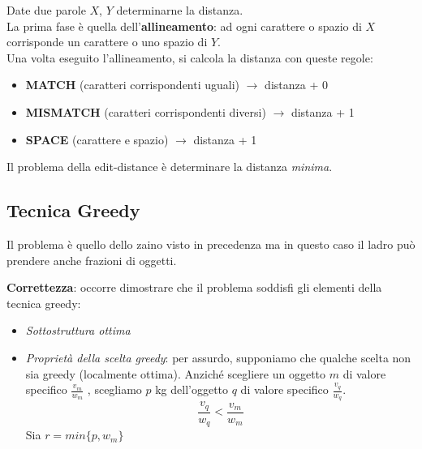 \begin{example}
	
\end{example}

\begin{example}
	Date due parole $X$, $Y$ determinarne la distanza.\\
	La prima fase è quella dell'\textbf{allineamento}: ad ogni carattere o spazio di $X$ corrisponde un carattere o uno spazio di $Y$.\\
	Una volta eseguito l'allineamento, si calcola la distanza con queste regole:
	\begin{itemize}
		\item \textbf{MATCH} (caratteri corrispondenti uguali) $\rightarrow$ distanza + 0
		\item \textbf{MISMATCH} (caratteri corrispondenti diversi) $\rightarrow$ distanza + 1
		\item \textbf{SPACE} (carattere e spazio) $\rightarrow$ distanza + 1
	\end{itemize}
	Il problema della edit-distance è determinare la distanza \emph{minima}.
\end{example}

\subsection{Tecnica Greedy}
\begin{example}
	Il problema è quello dello zaino visto in precedenza ma in questo caso il ladro può prendere anche frazioni di oggetti.
	
	\textbf{Correttezza}: occorre dimostrare che il problema soddisfi gli elementi della tecnica greedy:
	\begin{itemize}
		\item \emph{Sottostruttura ottima}
		\item \emph{Proprietà della scelta greedy}: per assurdo, supponiamo che qualche scelta non sia greedy (localmente ottima). Anziché scegliere un oggetto $m$ di valore specifico $\frac{v_m}{w_m}$ , scegliamo $p$ kg dell'oggetto $q$ di valore specifico $\frac{v_q}{w_q}$.
		\begin{equation*}
			\frac{v_q}{w_q} < \frac{v_m}{w_m}
		\end{equation*}
		Sia $r=min\{p, w_m\}$
	\end{itemize}
\end{example}

